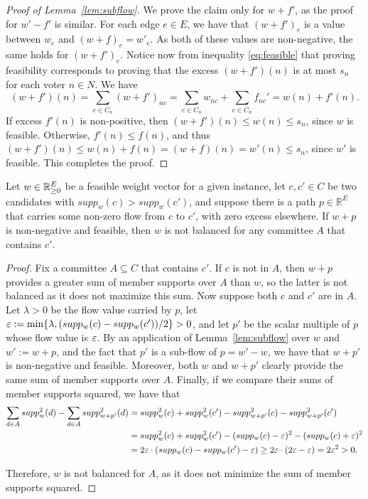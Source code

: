 \begin{proof}[Proof of Lemma~\ref{lem:subflow}]
We prove the claim only for $w+f'$, as the proof for $w'-f'$ is similar. 
For each edge $e\in E$, we have that $(w+f')_e$ is a value between $w_e$ and $(w+f)_e=w'_e$. As both of these values are non-negative, the same holds for $(w+f')_e$. 
Notice now from inequality \eqref{eq:feasible} that proving feasibility corresponds to proving that the excess $(w+f')(n)$ is at most $s_n$ for each voter $n\in N$. We have 
$$(w+f')(n) = \sum_{c\in C_n} (w+f')_{nc}= \sum_{c\in C_n} w_{nc} + \sum_{c\in C_n} f_{nc}' = w(n) + f'(n). $$
If excess $f'(n)$ is non-positive, then $(w+f')(n)\leq w(n) \leq s_n$, since $w$ is feasible. 
Otherwise, $f'(n)\leq f(n)$, and thus $(w+f')(n)\leq w(n) + f(n) = (w+f)(n) = w'(n) \leq s_n$, since $w'$ is feasible. This completes the proof.
\end{proof}

\begin{lemma}\label{lem:path}
Let $w\in \mathbb{R}_{\geq 0}^E$ be a feasible weight vector for a given instance, let $c,c'\in C$ be two candidates with $supp_w(c)>supp_w(c')$, and suppose there is a path $p\in\mathbb{R}^E$ that carries some non-zero flow from $c$ to $c'$, with zero excess elsewhere. If $w+p$ is non-negative and feasible, then $w$ is not balanced for any committee $A$ that contains $c'$.
\end{lemma}

\begin{proof}
Fix a committee $A\subseteq C$ that contains $c'$. If $c$ is not in $A$, then $w+p$ provides a greater sum of member supports over $A$ than $w$, so the latter is not balanced as it does not maximize this sum. Now suppose both $c$ and $c'$ are in $A$. Let $\lambda>0$ be the flow value carried by $p$, let $\varepsilon:=\min\{\lambda, (supp_w(c) - supp_w(c'))/2\}>0$, and let $p'$ be the scalar multiple of $p$ whose flow value is $\varepsilon$. By an application of Lemma~\ref{lem:subflow} over $w$ and $w':=w+p$, and the fact that $p'$ is a sub-flow of $p=w'-w$, we have that $w+p'$ is non-negative and feasible. Moreover, both $w$ and $w+p'$ clearly provide the same sum of member supports over $A$. Finally, if we compare their sums of member supports squared, we have that
\begin{align*}
\sum_{d\in A} supp_w^2(d)-\sum_{d\in A} supp^2_{w+p'}(d) &=supp_w^2(c) +supp_w^2(c')-supp^2_{w+p'}(c) -supp^2_{w+p'}(c')\\
&= supp_w^2(c) +supp_w^2(c') - (supp_w(c) - \varepsilon)^2 - (supp_w(c) + \varepsilon)^2 \\
&= 2\varepsilon\cdot (supp_w(c) - supp_w(c') - \varepsilon) \geq 2\varepsilon\cdot(2\varepsilon - \varepsilon)=2\varepsilon^2>0.
\end{align*}

Therefore, $w$ is not balanced for $A$, as it does not minimize the sum of member supports squared.  
\end{proof}

